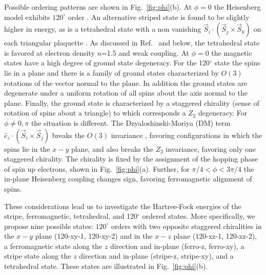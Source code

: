 \documentclass[%
reprint,
superscriptaddress,
twocolumn,
 amsmath,amssymb,
 aps,
 prb,
]{revtex4-2}
\begin{document}
Possible ordering patterns are shown in Fig.~\ref{fig:phi}(b). At $\phi=0$ the Heisenberg model exhibits $120^\circ$ order \cite{krishnamurthy1990mott,Jayaprakash_1991}. An alternative striped state is found to be slightly higher in energy, as is a tetrahedral state with a non vanishing $\vec{S}_{i} \cdot (\vec{S}_{j} \times \vec{S}_{k})$ on each triangular plaquette \cite{martin2008itinerant}. As discussed in Ref.~\cite{martin2008itinerant,pasrija2016noncollinear} and below, the tetrahedral state is favored at electron density $n$=1.5 and weak coupling. At $\phi=0$ the magnetic states have a high degree of ground state degeneracy. For the 120$^\circ$  state  the spins lie in a plane and there is a family of ground states characterized by $O(3)$ rotations of the vector normal to the plane. In addition the ground states are degenerate under a uniform rotation of all spins about the axis normal to the plane. Finally,  the ground state is characterized by a staggered chirality (sense of rotation of spins about a triangle) to which corresponds a $Z_2$ degeneracy.  For $\phi\neq 0,\pi$ the situation is different. The Dzyaloshinski-Moriya (DM) term $\hat{ e}_z\cdot (\vec{S}_i\times \vec{S}_j)$ breaks the $O(3)$ invariance \cite{dm1,dm2}, favoring configurations in which the spins lie in the $x-y$ plane, and also breaks the $Z_2$ invariance, favoring only one staggered chirality. The chirality is fixed by the assignment of the hopping phase of spin up electrons, shown in Fig.~\ref{fig:phi}(a). Further, for $\pi/4<\phi<3\pi/4$ the in-plane Heisenberg coupling changes sign, favoring ferromagnetic alignment of spins.  

These considerations lead us to investigate the Hartree-Fock energies of  the stripe, ferromagnetic, tetrahedral, and 120$^\circ$ ordered states. More specifically, we propose nine possible states: $120^{\circ}$ orders with two opposite staggered chiralities in the $x-y$ plane (120-xy-1, 120-xy-2) and in the $x-z$ plane (120-xz-1, 120-xz-2), a ferromagnetic state along the $z$ direction and in-plane (ferro-z, ferro-xy), a stripe state along the $z$ direction and in-plane (stripe-z, stripe-xy), and a tetrahedral state. These states are illustrated in Fig.~\ref{fig:phi}(b). 
\end{document}
